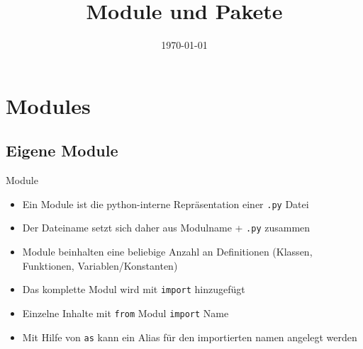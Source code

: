 

\usepackage{comment}

\newcommand{\topic}{
	Module und Pakete
}

\title{\topic}
\supertitle{\course}
\date{\today}



\maketitle

\begin{frame}
	\tableofcontents
\end{frame}


\section{Modules}
\subsection{Eigene Module}
\begin{frame}[fragile]{Module}
	\begin{itemize}
		\item Ein Module ist die python-interne Repräsentation einer \texttt{.py} Datei
		\item Der Dateiname setzt sich daher aus Modulname + \texttt{.py} zusammen
		\item Module beinhalten eine beliebige Anzahl an Definitionen (Klassen, Funktionen, Variablen/Konstanten)
		\item Das komplette Modul wird mit \texttt{import} hinzugefügt
		\item Einzelne Inhalte mit \texttt{from} Modul \texttt{import} Name
		\item Mit Hilfe von \texttt{as} kann ein Alias für den importierten namen angelegt werden
	\end{itemize}

\end{frame}

